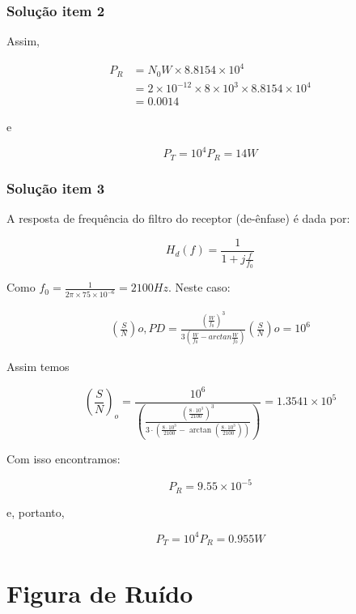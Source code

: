 \documentclass[aspectratio=169,dvipsnames]{beamer}
\begin{document}
\begin{frame}
  \frametitle{Solução item 2}

  Assim, 

\begin{align*}
  P_R &= N_0W \times 8.8154 \times 10^4 \\
     &= 2 \times 10^{-12} \times 8 \times 10^3 \times 8.8154 \times 10^4 \\
     &= 0.0014
\end{align*}

e

$$P_T = 10^4 P_R = 14 W$$

\end{frame}


\begin{frame}
  \frametitle{Solução item 3}

  A resposta de frequência do filtro do receptor (de-ênfase) é dada por: 


$$H_d(f) = \frac{1}{1+j \frac{f}{f_0}}$$

Como $f_0 = \frac{1}{2 \pi \times 75 \times 10^{-6}} = 2100Hz$. Neste caso: 

\begin{align*}
\left(\frac{S}{N}\right){o,PD} =  \frac{\left(\frac{W}{f_0} \right)^3}{3 \left( \frac{W}{f_0} - arctan \frac{W}{f_0} \right)} \left(\frac{S}{N}\right){o} = 10^6 
\end{align*}



\end{frame}

\begin{frame}
  Assim temos 

$$
\left(\frac{S}{N}\right)_{o} = \frac{10^6}{\left( \frac{\left(\frac{8 \cdot 10^3}{2100}\right)^3}{3 \cdot\left(\frac{8 \cdot 10^3}{2100}-\arctan \left(\frac{8 \cdot 10^3}{2100}\right)\right)} \right)} = 1.3541 \times 10^5
$$


Com isso encontramos: 


$$ P_R = 9.55 \times 10^{-5}$$


e, portanto, 

$$P_T = 10^4P_R = 0.955W$$

\end{frame}

\section{Figura de Ruído}
\end{document}
